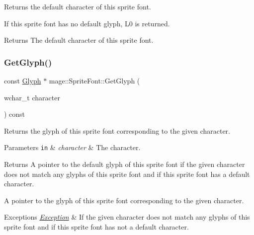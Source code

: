 Returns the default character of this sprite font.

If this sprite font has no default glyph, {\ttfamily L\textquotesingle{}0\textquotesingle{}} is returned.

\begin{DoxyReturn}{Returns}
The default character of this sprite font. 
\end{DoxyReturn}
\hypertarget{classmage_1_1_sprite_font_aa13424a1e0153ffb9433bb2cb416360b}{}\label{classmage_1_1_sprite_font_aa13424a1e0153ffb9433bb2cb416360b} 
\subsubsection{\texorpdfstring{Get\+Glyph()}{GetGlyph()}}
{\footnotesize\ttfamily const \hyperlink{structmage_1_1_glyph}{Glyph} $\ast$ mage\+::\+Sprite\+Font\+::\+Get\+Glyph (\begin{DoxyParamCaption}\item[{wchar\+\_\+t}]{character }\end{DoxyParamCaption}) const}

Returns the glyph of this sprite font corresponding to the given character.


\begin{DoxyParams}[1]{Parameters}
\mbox{\tt in}  & {\em character} & The character. \\
\hline
\end{DoxyParams}
\begin{DoxyReturn}{Returns}
A pointer to the default glyph of this sprite font if the given character does not match any glyphs of this sprite font and if this sprite font has a default character. 

A pointer to the glyph of this sprite font corresponding to the given character. 
\end{DoxyReturn}

\begin{DoxyExceptions}{Exceptions}
{\em \hyperlink{classmage_1_1_exception}{Exception}} & If the given character does not match any glyphs of this sprite font and if this sprite font has not a default character. \\
\hline
\end{DoxyExceptions}
\hypertarget{classmage_1_1_sprite_font_ac64978e793aa09bf3fa163b02071ab5b}{}\label{classmage_1_1_sprite_font_ac64978e793aa09bf3fa163b02071ab5b} 
